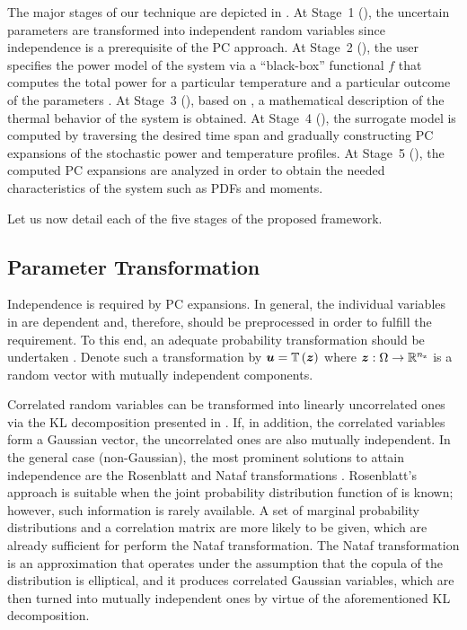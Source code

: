 The major stages of our technique are depicted in . At
Stage~1 (), the uncertain parameters \vu
are transformed into independent random variables \vz since independence is a
prerequisite of the \ac{PC} approach. At Stage~2 (),
the user specifies the power model of the system via a ``black-box'' functional
$f$ that computes the total power \vp for a particular temperature \vq and a
particular outcome of the parameters \vu. At Stage~3
(), based on , a
mathematical description of the thermal behavior of the system is obtained. At
Stage~4 (), the surrogate model is computed by
traversing the desired time span and gradually constructing \ac{PC} expansions
of the stochastic power and temperature profiles. At Stage~5
(), the computed \ac{PC} expansions are analyzed in
order to obtain the needed characteristics of the system such as \acp{PDF} and
moments.

Let us now detail each of the five stages of the proposed framework.

\subsection{Parameter Transformation}

Independence is required by \ac{PC} expansions. In general, the \nu individual
variables in \vu are dependent and, therefore, should be preprocessed in order
to fulfill the requirement. To this end, an adequate probability transformation
should be undertaken \cite{eldred2008}. Denote such a transformation by $\boldsymbol{u} =
\mathbb{T}\left(\boldsymbol{z}\right)$ where $\boldsymbol{z}: \Omega \to \mathbb{R}^{n_\mathrm{z}}$ is a random vector with \nz
mutually independent components.

Correlated random variables can be transformed into linearly uncorrelated ones
via the \ac{KL} decomposition presented in .
If, in addition, the correlated variables form a Gaussian vector, the
uncorrelated ones are also mutually independent. In the general case
(non-Gaussian), the most prominent solutions to attain independence are the
Rosenblatt \cite{rosenblatt1952} and Nataf transformations \cite{li2008}.
Rosenblatt's approach is suitable when the joint probability distribution
function of \vu is known; however, such information is rarely available. A set
of marginal probability distributions and a correlation matrix are more likely
to be given, which are already sufficient for perform the Nataf transformation.
The Nataf transformation is an approximation that operates under the assumption
that the copula of the distribution is elliptical, and it produces correlated
Gaussian variables, which are then turned into mutually independent ones by
virtue of the aforementioned \ac{KL} decomposition.

